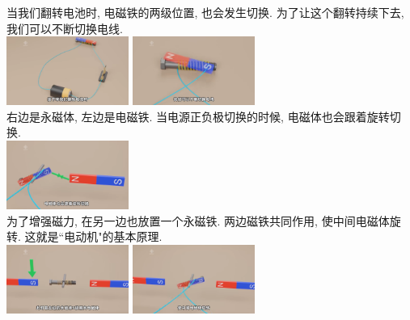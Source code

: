 \documentclass[UTF8]{ctexart}
\begin{document}
	当我们翻转电池时, 电磁铁的两级位置, 也会发生切换. 	为了让这个翻转持续下去, 我们可以不断切换电线. \\
	\includegraphics[width=0.3\textwidth]{img/0094.png}	
	\includegraphics[width=0.3\textwidth]{img/0095.png}	\\	
	
	右边是永磁体, 左边是电磁铁. 当电源正负极切换的时候, 电磁体也会跟着旋转切换.
	 \\
		\includegraphics[width=0.3\textwidth]{img/0096.png}	\\
		
		为了增强磁力, 在另一边也放置一个永磁铁. 两边磁铁共同作用, 使中间电磁体旋转. 这就是``电动机"的基本原理. \\
	\includegraphics[width=0.3\textwidth]{img/0097.png}	
	\includegraphics[width=0.3\textwidth]{img/0098.png}	 \\
		
		
		\vspace{1em} 
		
		
\end{document}
